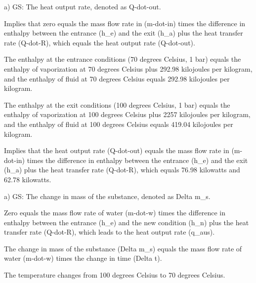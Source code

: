 a) GS: The heat output rate, denoted as Q-dot-out.

Implies that zero equals the mass flow rate in (m-dot-in) times the difference in enthalpy between the entrance (h_e) and the exit (h_a) plus the heat transfer rate (Q-dot-R), which equals the heat output rate (Q-dot-out).

The enthalpy at the entrance conditions (70 degrees Celsius, 1 bar) equals the enthalpy of vaporization at 70 degrees Celsius plus 292.98 kilojoules per kilogram, and the enthalpy of fluid at 70 degrees Celsius equals 292.98 kilojoules per kilogram.

The enthalpy at the exit conditions (100 degrees Celsius, 1 bar) equals the enthalpy of vaporization at 100 degrees Celsius plus 2257 kilojoules per kilogram, and the enthalpy of fluid at 100 degrees Celsius equals 419.04 kilojoules per kilogram.

Implies that the heat output rate (Q-dot-out) equals the mass flow rate in (m-dot-in) times the difference in enthalpy between the entrance (h_e) and the exit (h_a) plus the heat transfer rate (Q-dot-R), which equals 76.98 kilowatts and 62.78 kilowatts.

a) GS: The change in mass of the substance, denoted as Delta m_s.

Zero equals the mass flow rate of water (m-dot-w) times the difference in enthalpy between the entrance (h_e) and the new condition (h_n) plus the heat transfer rate (Q-dot-R), which leads to the heat output rate (q_aus).

The change in mass of the substance (Delta m_s) equals the mass flow rate of water (m-dot-w) times the change in time (Delta t).

The temperature changes from 100 degrees Celsius to 70 degrees Celsius.